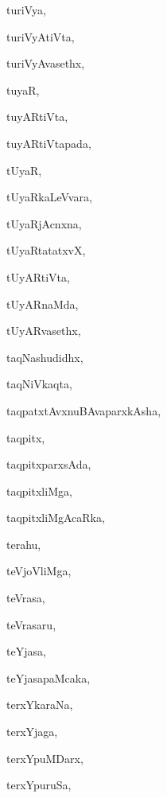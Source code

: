 \begin{multicols}{3}
{\noindent
{turiVya}, \pageref{turiVya}

\noindent
{turiVyAtiVta}, \pageref{turiVyAtiVta}

\noindent
{turiVyAvasethx}, \pageref{turiVyAvasethx}

\noindent
{tuyaR}, \pageref{tuyaR}

\noindent
{tuyARtiVta}, \pageref{tuyARtiVta}

\noindent
{tuyARtiVtapada}, \pageref{tuyARtiVtapada}

\noindent
{tUyaR}, \pageref{tUyaR}

\noindent
{tUyaRkaLeVvara}, \pageref{tUyaRkaLeVvara}

\noindent
{tUyaRjAcnxna}, \pageref{tUyaRjAcnxna}

\noindent
{tUyaRtatatxvX}, \pageref{tUyaRtatatxvX}

\noindent
{tUyARtiVta}, \pageref{tUyARtiVta}

\noindent
{tUyARnaMda}, \pageref{tUyARnaMda}

\noindent
{tUyARvasethx}, \pageref{tUyARvasethx}

\noindent
{taqNashudidhx}, \pageref{taqNashudidhx}

\noindent
{taqNiVkaqta}, \pageref{taqNiVkaqta}

\noindent
{taqpatxtAvxnuBAvaparxkAsha}, \pageref{taqpatxtAvxnuBAvaparxkAsha}

\noindent
{taqpitx}, \pageref{taqpitx}

\noindent
{taqpitxparxsAda}, \pageref{taqpitxparxsAda}

\noindent
{taqpitxliMga}, \pageref{taqpitxliMga}

\noindent
{taqpitxliMgAcaRka}, \pageref{taqpitxliMgAcaRka}

\noindent
{terahu}, \pageref{terahu}

\noindent
{teVjoVliMga}, \pageref{teVjoVliMga}

\noindent
{teVrasa}, \pageref{teVrasa}

\noindent
{teVrasaru}, \pageref{teVrasaru}

\noindent
{teYjasa}, \pageref{teYjasa}

\noindent
{teYjasapaMcaka}, \pageref{teYjasapaMcaka}

\noindent
{terxYkaraNa}, \pageref{terxYkaraNa}

\noindent
{terxYjaga}, \pageref{terxYjaga}

\noindent
{terxYpuMDarx}, \pageref{terxYpuMDarx}

\noindent
{terxYpuruSa}, \pageref{terxYpuruSa}

}
\end{multicols}
